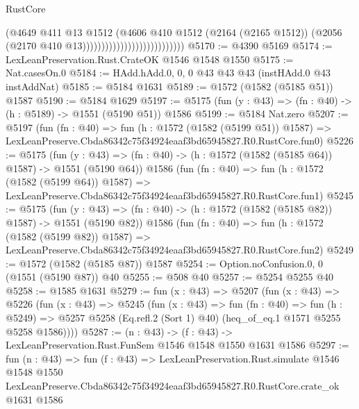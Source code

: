 \begin{lexlean}{RustCore}
\begin{coremodule}
                                                  (@4649
                                                    @411
                                                    @13
                                                    @1512
                                                    (@4606
                                                      @410
                                                      @1512
                                                      (@2164 (@2165 @1512))
                                                      (@2056
                                                        (@2170 @410 @13)))))))))))))))))))))))))))
@5170 := @4390 @5169
@5174 := LexLeanPreservation.Rust.CrateOK @1546 @1548 @1550
@5175 := Nat.casesOn.{0}
@5184 := HAdd.hAdd.{0, 0, 0} @43 @43 @43 (instHAdd.{0} @43 instAddNat)
@5185 := @5184 @1631
@5189 := @1572 (@1582 (@5185 @51)) @1587
@5190 := @5184 @1629
@5197 := @5175 (fun (y : @43) => (fn : @40) -> (h : @5189) -> @1551 (@5190 @51)) @1586
@5199 := @5184 Nat.zero
@5207 := @5197
    (fun (fn : @40) =>
    fun (h : @1572 (@1582 (@5199 @51)) @1587) =>
    LexLeanPreserve.Cbda86342c75f34924eaaf3bd65945827.R0.RustCore.fun0)
@5226 := @5175
    (fun (y : @43) => (fn : @40) -> (h : @1572 (@1582 (@5185 @64)) @1587) -> @1551 (@5190 @64))
    @1586
    (fun (fn : @40) =>
    fun (h : @1572 (@1582 (@5199 @64)) @1587) =>
    LexLeanPreserve.Cbda86342c75f34924eaaf3bd65945827.R0.RustCore.fun1)
@5245 := @5175
    (fun (y : @43) => (fn : @40) -> (h : @1572 (@1582 (@5185 @82)) @1587) -> @1551 (@5190 @82))
    @1586
    (fun (fn : @40) =>
    fun (h : @1572 (@1582 (@5199 @82)) @1587) =>
    LexLeanPreserve.Cbda86342c75f34924eaaf3bd65945827.R0.RustCore.fun2)
@5249 := @1572 (@1582 (@5185 @87)) @1587
@5254 := Option.noConfusion.{0, 0} (@1551 (@5190 @87)) @40
@5255 := @508 @40
@5257 := @5254 @5255 @40
@5258 := @1585 @1631
@5279 := fun (x : @43) =>
  @5207
    (fun (x : @43) =>
    @5226
      (fun (x : @43) =>
      @5245
        (fun (x : @43) =>
        fun (fn : @40) =>
        fun (h : @5249) =>
        @5257 @5258 (Eq.refl.{2} (Sort 1) @40) (heq_of_eq.{1} @1571 @5255 @5258 @1586))))
@5287 := (n : @43) -> (f : @43) -> LexLeanPreservation.Rust.FunSem @1546 @1548 @1550 @1631 @1586
@5297 := fun (n : @43) =>
  fun (f : @43) =>
  LexLeanPreservation.Rust.simulate
    @1546
    @1548
    @1550
    LexLeanPreserve.Cbda86342c75f34924eaaf3bd65945827.R0.RustCore.crate_ok
    @1631
    @1586
\end{coremodule}
\end{lexlean}
